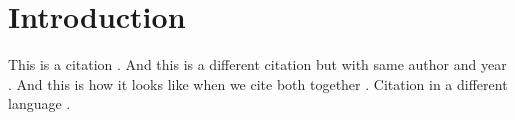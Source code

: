 \section{Introduction}

This is a citation \citep{malchukov2015}. And this is a different citation but with same author and year \citep{malchukov2015a}. And this is how it looks like when we cite both together \citep{malchukov2015, malchukov2015a}. Citation in a different language \citep{yuan2010}.

